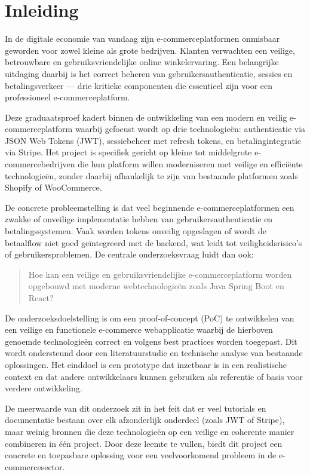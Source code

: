 


\section{Inleiding}%
\label{sec:inleiding}
In de digitale economie van vandaag zijn e-commerceplatformen onmisbaar geworden voor zowel kleine als grote bedrijven. Klanten verwachten een veilige, betrouwbare en gebruiksvriendelijke online winkelervaring. Een belangrijke uitdaging daarbij is het correct beheren van gebruikersauthenticatie, sessies en betalingsverkeer — drie kritieke componenten die essentieel zijn voor een professioneel e-commerceplatform.

Deze graduaatsproef kadert binnen de ontwikkeling van een modern en veilig e-commerceplatform waarbij gefocust wordt op drie technologieën: authenticatie via JSON Web Tokens (JWT), sessiebeheer met refresh tokens, en betalingintegratie via Stripe. Het project is specifiek gericht op kleine tot middelgrote e-commercebedrijven die hun platform willen moderniseren met veilige en efficiënte technologieën, zonder daarbij afhankelijk te zijn van bestaande platformen zoals Shopify of WooCommerce.

De concrete probleemstelling is dat veel beginnende e-commerceplatformen een zwakke of onveilige implementatie hebben van gebruikersauthenticatie en betalingssystemen. Vaak worden tokens onveilig opgeslagen of wordt de betaalflow niet goed geïntegreerd met de backend, wat leidt tot veiligheidsrisico's of gebruikersproblemen. De centrale onderzoeksvraag luidt dan ook:


\begin{quote}
Hoe kan een veilige en gebruiksvriendelijke e-commerceplatform worden opgebouwd met moderne webtechnologieën zoals Java Spring Boot en React?
\end{quote}

De onderzoeksdoelstelling is om een proof-of-concept (PoC) te ontwikkelen van een veilige en functionele e-commerce webapplicatie waarbij de hierboven genoemde technologieën correct en volgens best practices worden toegepast. Dit wordt ondersteund door een literatuurstudie en technische analyse van bestaande oplossingen. Het einddoel is een prototype dat inzetbaar is in een realistische context en dat andere ontwikkelaars kunnen gebruiken als referentie of basis voor verdere ontwikkeling.

De meerwaarde van dit onderzoek zit in het feit dat er veel tutorials en documentatie bestaan over elk afzonderlijk onderdeel (zoals JWT of Stripe), maar weinig bronnen die deze technologieën op een veilige en coherente manier combineren in één project. Door deze leemte te vullen, biedt dit project een concrete en toepasbare oplossing voor een veelvoorkomend probleem in de e-commercesector.

